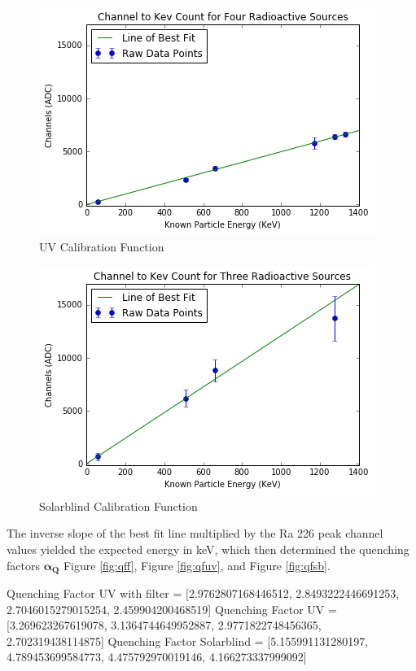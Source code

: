 \documentclass[aip, jmp, amssymb, amsmath, reprint, floatfix]{revtex4-1}
\begin{document}
\begin{figure}
  \centering
    \includegraphics[width=.8\columnwidth]{chanuv.png}
  \caption{UV Calibration Function}
  \label{fig:chanuv}
\end{figure} 

\begin{figure}
  \centering
    \includegraphics[width=.8\columnwidth]{chansb.png}
  \caption{Solarblind Calibration Function}
  \label{fig:chansb}
\end{figure} 

The inverse slope of the best fit line multiplied by the Ra 226 peak channel values yielded the expected energy in keV, which then determined the quenching factors $\bm{\alpha_Q}$ Figure \ref{fig:qff}, Figure \ref{fig:qfuv}, and Figure \ref{fig:qfsb}.

\setlength{\parskip}{2em}
\noindent
Quenching Factor UV with filter = [2.9762807168446512, 2.8493222446691253, 2.7046015279015254, 2.459904200468519]
\noindent
Quenching Factor UV = [3.269623267619078, 3.1364744649952887, 2.9771822748456365, 2.702319438114875]
\noindent
Quenching Factor Solarblind = [5.155991131280197, 4.789453699584773, 4.475792970019146, 4.166273337999092]
\end{document}
